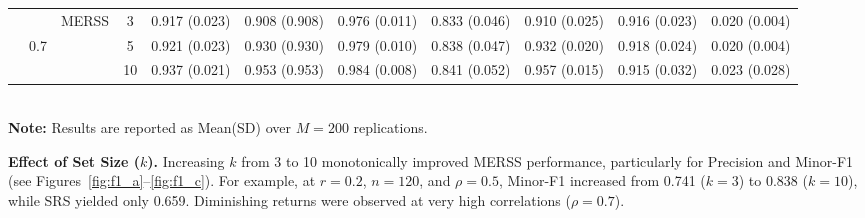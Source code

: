 \documentclass[twoside]{article}
\begin{document}
\begin{table}[!htb]
{\begin{tabular}{c c c c c c c c c c c}
    \cmidrule(lr){3-11}
    &                      & \multirow{3}{*}{MERSS}   &  3   & 
    0.917 (0.023) & 0.908 (0.908) & 0.976 (0.011) & 0.833 (0.046) & 0.910 (0.025) & 0.916 (0.023)& 0.020 (0.004)  \\

    &               0.7       &                                          &  5    &
 0.921 (0.023) & 0.930 (0.930) & 0.979 (0.010) & 0.838 (0.047) & 0.932 (0.020) & 0.918 (0.024)& 0.020 (0.004)  \\

    &                      &                                          &  10   &
  0.937 (0.021) & 0.953 (0.953) & 0.984 (0.008) & 0.841 (0.052) & 0.957 (0.015) & 0.915 (0.032)& 0.023 (0.028)  \\

    \bottomrule 
\end{tabular}
}
 \\[4pt]
    \scriptsize \textbf{Note:} Results are reported as Mean(SD) over \(M = 200\) replications.

\end{table}


\textbf{Effect of Set Size (\(k\)).}
Increasing \(k\) from 3 to 10 monotonically improved MERSS performance, particularly for Precision and Minor-F1 (see Figures~\ref{fig:f1_a}--\ref{fig:f1_c}). For example, at \(r=0.2\), \(n=120\), and \(\rho=0.5\), Minor-F1 increased from 0.741 (\(k=3\)) to 0.838 (\(k=10\)), while SRS yielded only 0.659. Diminishing returns were observed at very high correlations (\(\rho=0.7\)).
\end{document}
